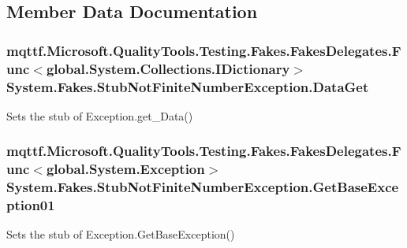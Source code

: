 \subsection{Member Data Documentation}
\hypertarget{class_system_1_1_fakes_1_1_stub_not_finite_number_exception_a575e74c70db3997c53ef1307eba807fb}{
\subsubsection[{Data\-Get}]{\setlength{\rightskip}{0pt plus 5cm}mqttf.\-Microsoft.\-Quality\-Tools.\-Testing.\-Fakes.\-Fakes\-Delegates.\-Func$<$global.\-System.\-Collections.\-I\-Dictionary$>$ System.\-Fakes.\-Stub\-Not\-Finite\-Number\-Exception.\-Data\-Get}}\label{class_system_1_1_fakes_1_1_stub_not_finite_number_exception_a575e74c70db3997c53ef1307eba807fb}


Sets the stub of Exception.\-get\-\_\-\-Data()

\hypertarget{class_system_1_1_fakes_1_1_stub_not_finite_number_exception_abb630995600f53fa7b7aed9232633145}{
\subsubsection[{Get\-Base\-Exception01}]{\setlength{\rightskip}{0pt plus 5cm}mqttf.\-Microsoft.\-Quality\-Tools.\-Testing.\-Fakes.\-Fakes\-Delegates.\-Func$<$global.\-System.\-Exception$>$ System.\-Fakes.\-Stub\-Not\-Finite\-Number\-Exception.\-Get\-Base\-Exception01}}\label{class_system_1_1_fakes_1_1_stub_not_finite_number_exception_abb630995600f53fa7b7aed9232633145}


Sets the stub of Exception.\-Get\-Base\-Exception()

